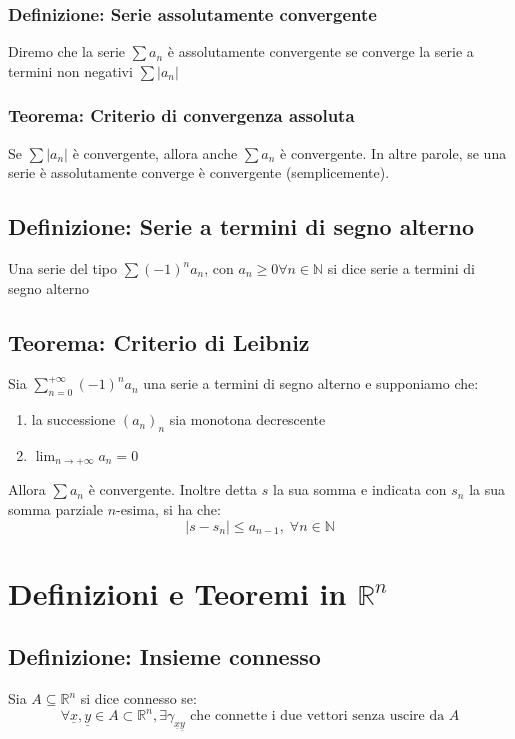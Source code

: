 \documentclass[a4paper,12pt,openright]{book}
\begin{document}
	\subsection{Definizione: Serie assolutamente convergente}
	Diremo che la serie $\sum a_n$ è assolutamente convergente se converge la serie a termini non negativi $\sum |a_n|$
	
	\subsection{Teorema: Criterio di convergenza assoluta}
	Se $\sum |a_n|$ è convergente, allora anche $\sum a_n$ è convergente. In altre parole, se una serie è assolutamente converge è convergente (semplicemente).
	
	\section{Definizione: Serie a termini di segno alterno}
	Una serie del tipo $\sum (-1)^n a_n$, con $a_n \geq 0 \forall n \in \mathbb{N}$ si dice serie a termini di segno alterno
	
	\section{Teorema: Criterio di Leibniz}
	Sia $\sum_{n=0}^{+\infty} (-1)^n a_n$ una serie a termini di segno alterno e supponiamo che:
	\begin{enumerate}[label=\roman*)]
		\item la successione $(a_n)_n$ sia monotona decrescente
		\item $\lim_{n \to +\infty} a_n = 0$
	\end{enumerate}
	Allora $\sum a_n$ è convergente. Inoltre detta $s$ la sua somma e indicata con $s_n$ la sua somma parziale $n$-esima, si ha che:
	\[|s - s_n| \leq a_{n - 1}, \; \forall n \in \mathbb{N}\]
			
    \chapter{Definizioni e Teoremi in $\mathbb{R}^n$}
    
    \section{Definizione: Insieme connesso}
    Sia $A \subseteq \mathbb{R}^n$ si dice connesso se:
    \[\forall \underline{x}, \underline{y} \in A \subset \mathbb{R}^n, \exists \gamma_{\underline{x}\underline{y}} \text{ che connette i due vettori senza uscire da } A\] 
    
\end{document}
